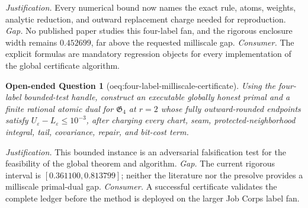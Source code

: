 \documentclass{article}
\newtheorem{openendedquestion}{Open-ended Question}
\begin{document}
\par\smallskip\noindent \textit{Justification.} Every numerical bound now names the exact rule, atoms, weights, analytic reduction, and outward replacement charge needed for reproduction. \textit{Gap.} No published paper studies this four-label fan, and the rigorous enclosure width remains \(0.452699\), far above the requested milliscale gap. \textit{Consumer.} The explicit formulas are mandatory regression objects for every implementation of the global certificate algorithm.

\begin{openendedquestion}[oeq:four-label-milliscale-certificate]\label{oeq:four-label-milliscale-certificate}
Using the four-label bounded-test handle, construct an executable globally honest primal and a finite rational atomic dual for \(\mathfrak G_4\) at \(r=2\) whose fully outward-rounded endpoints satisfy \(U_{\varepsilon}-L_{\varepsilon}\le10^{-3}\), after charging every chart, seam, protected-neighborhood integral, tail, covariance, repair, and bit-cost term.
\end{openendedquestion}
\par\smallskip\noindent \textit{Justification.} This bounded instance is an adversarial falsification test for the feasibility of the global theorem and algorithm. \textit{Gap.} The current rigorous interval is \([0.361100,0.813799]\); neither the literature nor the presolve provides a milliscale primal-dual gap. \textit{Consumer.} A successful certificate validates the complete ledger before the method is deployed on the larger Job Corps label fan.
\end{document}
